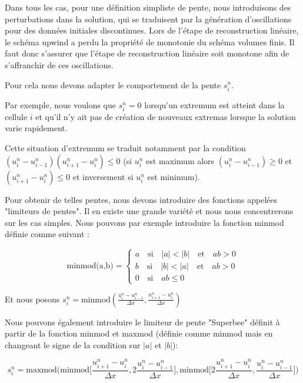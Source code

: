 Dans tous les cas, pour une définition simpliste de pente, nous 
introduisons des perturbations dans la solution, qui se traduisent par la
génération d'oscillations pour des données initiales discontinues.
Lors de l'étape de reconstruction linéaire, le schéma upwind a perdu la propriété de monotonie du schéma volumes finis. 
Il faut donc s'assurer que l'étape de reconstruction linéaire soit monotone afin de s'affranchir de ces oscillations.

Pour cela nous devons adapter le comportement de la pente $s_i^n$.

\vspace{1em}
Par exemple, nous voulons que $s_i^n = 0$ lorsqu'un extremum est atteint dans la cellule $i$ et qu'il n'y ait pas de création de nouveaux extremas lorsque la solution varie rapidement.

Cette situation d'extremum se traduit notamment par la condition $(u_i^n - u_{i-1}^n)(u_{i+1}^n - u_i^n) \leq 0$ (si $u_i^n$ est maximum alors $(u_i^n - u_{i-1}^n) \geq 0$ et $(u_{i+1}^n - u_i^n) \leq 0$ et inversement si $u_i^n$ est minimum).

Pour obtenir de telles pentes, nous devons introduire des fonctions appelées "limiteurs de pentes". Il en existe une grande variété et nous nous concentrerons sur les cas simples.
Nous pouvons par exemple introduire la fonction minmod définie comme suivant :

$$\text{minmod(a,b)} = \begin{cases}
    a \quad \text{si} \quad |a| < |b| \quad \text{et} \quad ab>0 \\
    b \quad \text{si} \quad |b| < |a| \quad \text{et} \quad ab>0 \\
    0 \quad \text{si} \quad ab \leq 0
\end{cases}$$

Et nous posons $s_i^n = \text{minmod}(\frac{u_i^n - u_{i-1}^n}{\Delta x}, \frac{u_{i+1}^n - u_i^n}{\Delta x})$

\vspace{1em}
Nous pouvons également introduire le limiteur de pente "Superbee" définit à partir de la fonction minmod et maxmod (définie comme minmod mais en changeant le signe de la condition sur $|a|$ et $|b|$):

$$s_i^n = \text{maxmod}\Bigg(\text{minmod}\bigg[\frac{u_{i+1}^n - u_i^n}{\Delta x},2\frac{u_i^n - u_{i-1}^n}{\Delta x}\bigg],\text{minmod}\bigg[2\frac{u_{i+1}^n - u_i^n}{\Delta x},\frac{u_i^n - u_{i-1}^n}{\Delta x}\bigg]\Bigg)$$

